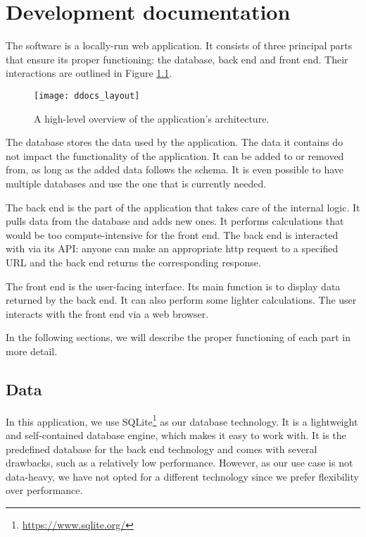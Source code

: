 \chapter{Development documentation}

The software is a locally-run web application. It consists of three principal parts that ensure its proper functioning: the database, back end and
front end. Their interactions are outlined in Figure \ref{fig:architecture}.

\begin{figure}[!h]
\centering
\texttt{[image: ddocs\_layout]}
\caption{A high-level overview of the application's architecture.}
\label{fig:architecture}
\end{figure}

The database stores the data used by the application. The data it contains do not impact the functionality of the application. It can be added
to or removed from, as long as the added data follows the schema. It is even possible to have multiple databases and use the one that is currently needed.

The back end is the part of the application that takes care of the internal logic. It pulls data from the database and adds new ones. It performs calculations
that would be too compute-intensive for the front end. The back end is interacted with via its API: anyone can make an appropriate http request
to a specified URL and the back end returns the corresponding response.

The front end is the user-facing interface. Its main function is to display data returned by the back end. It can also perform some lighter calculations.
The user interacts with the front end via a web browser.

In the following sections, we will describe the proper functioning of each part in more detail.

\section{Data}

In this application, we use SQLite\footnote{\url{https://www.sqlite.org/}} as our data\-base technology. It is a lightweight and self-contained database engine,
which makes it easy to work with. It is the predefined database for the back end technology and comes with several drawbacks, such as a relatively low performance.
However, as our use case is not data-heavy, we have not opted for a different technology since we prefer flexibility over performance.

